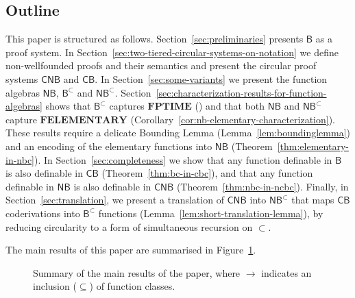\documentclass[manuscript,screen]{acmart}
\theoremstyle{definition}
\theoremstyle{remark}
\newcommand{\permpref}{\subset}
\newcommand{\ptime}{\mathbf{PTIME}}
\newcommand{\elementary}{\mathbf{ELEMENTARY}}
\newcommand{\f}{\mathbf{F}}
\newcommand{\fptime}{\f\ptime}
\newcommand{\felementary}{\f\elementary}
\newcommand{\bc}{\mathsf{B}}
\newcommand{\bcwfpo}[1]{\bc^{#1}}
\newcommand{\bcnorec}{\bc^{-}}
\newcommand{\nested}{\mathsf{N}}
\newcommand{\nbc}{\nested\bc}
\newcommand{\nbcwfpo}[1]{\nested\bcwfpo{#1}}
\newcommand{\bcpp}{\bcwfpo{\permpref}}
\newcommand{\nbcpp}{\nbcwfpo{\permpref}}
\newcommand{\cyclic}{\mathsf{C}}
\newcommand{\cbc}{\cyclic\bc}
\newcommand{\ncbc}{\cyclic\nested\bc}
\begin{document}
\subsection*{Outline}
This paper is structured as follows. Section~\ref{sec:preliminaries} presents $\bc$ as a proof system.
In Section~\ref{sec:two-tiered-circular-systems-on-notation} we define non-wellfounded proofs and their semantics
and present the circular proof systems $\ncbc$ and $\cbc$.
In Section~\ref{sec:some-variants} we present the function algebras  $\nbc$, $\bcpp$ and $\nbcpp$. 
Section~\ref{sec:characterization-results-for-function-algebras} shows that $\bcpp$ captures $\fptime$ () and that both $\nbc$ and $\nbcpp$ capture $\felementary$ (Corollary~\ref{cor:nb-elementary-characterization}). 
These results require a delicate Bounding Lemma (Lemma~\ref{lem:boundinglemma}) and an encoding of the elementary functions into $\nbc$ (Theorem~\ref{thm:elementary-in-nbc}). In Section~\ref{sec:completeness} we show that any function definable in $\bc$ is also definable in $\cbc$ (Theorem~\ref{thm:bc-in-cbc}), and that any function definable in $\nbc$ is also definable in $\ncbc$ (Theorem~\ref{thm:nbc-in-ncbc}). 
Finally, in Section~\ref{sec:translation}, we present a translation of $\ncbc$ into $\nbcpp$ that maps $\cbc$ coderivations into $\bcpp$ functions (Lemma~\ref{lem:short-translation-lemma}), by reducing circularity to a form of simultaneous recursion on $\permpref$. 

The main results of this paper are summarised in Figure~\ref{fig:picture-main-results}. 

\begin{figure}[t]
    \centering
    \small
{}
    \caption{Summary of the main results of the paper, where $\rightarrow$ indicates an inclusion ($\subseteq$) of function classes. 
    }
    \label{fig:picture-main-results}
\end{figure}
\end{document}
